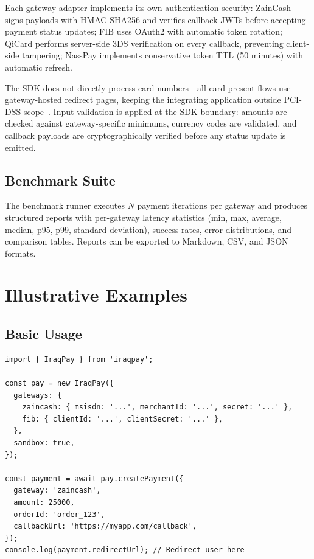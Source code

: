 \documentclass[10pt, a4paper, oneside]{article}
\begin{document}
Each gateway adapter implements its own authentication security: ZainCash signs payloads with HMAC-SHA256 and verifies callback JWTs before accepting payment status updates; FIB uses OAuth2 with automatic token rotation; QiCard performs server-side 3DS verification on every callback, preventing client-side tampering; NassPay implements conservative token TTL (50 minutes) with automatic refresh.

The SDK does not directly process card numbers---all card-present flows use gateway-hosted redirect pages, keeping the integrating application outside PCI-DSS scope~\cite{pcidss2022}. Input validation is applied at the SDK boundary: amounts are checked against gateway-specific minimums, currency codes are validated, and callback payloads are cryptographically verified before any status update is emitted.

\subsection{Benchmark Suite}

The benchmark runner executes $N$ payment iterations per gateway and produces structured reports with per-gateway latency statistics (min, max, average, median, p95, p99, standard deviation), success rates, error distributions, and comparison tables. Reports can be exported to Markdown, CSV, and JSON formats.


\section{Illustrative Examples}

\subsection{Basic Usage}

\begin{lstlisting}[style=typescript,caption={Basic payment creation with two gateways},label={lst:basic}]
import { IraqPay } from 'iraqpay';

const pay = new IraqPay({
  gateways: {
    zaincash: { msisdn: '...', merchantId: '...', secret: '...' },
    fib: { clientId: '...', clientSecret: '...' },
  },
  sandbox: true,
});

const payment = await pay.createPayment({
  gateway: 'zaincash',
  amount: 25000,
  orderId: 'order_123',
  callbackUrl: 'https://myapp.com/callback',
});
console.log(payment.redirectUrl); // Redirect user here
\end{lstlisting}
\end{document}
